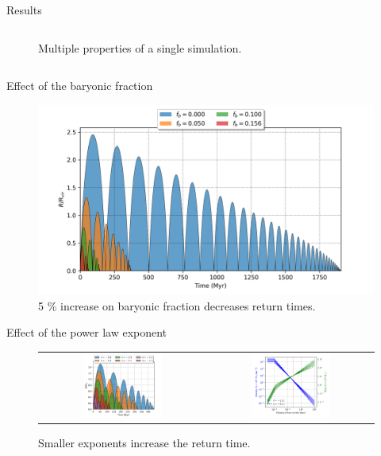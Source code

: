 \documentclass{beamer}
\begin{document}
\begin{frame}{Results}
\begin{columns}
\begin{column}{0.7\linewidth}
\begin{figure}[h]
				\caption{Multiple properties of a single simulation.}
			\end{figure}
		\end{column}
	\end{columns}
\end{frame}

\begin{frame}{Effect of the baryonic fraction}
	\begin{figure}[h]
		\centering
		\includegraphics[height=0.7\textheight]{"../Files/Week 5/baryonic_fraction_comparison"}
		\caption{5 \% increase on baryonic fraction decreases return times.}
	\end{figure}
\end{frame}

\begin{frame}{Effect of the power law exponent}
	\begin{figure}[h]
		\centering
		\begin{tabular}{cc}
			\includegraphics[width = 0.5\textwidth]{"../Files/Week 6/power_law"} & \includegraphics[width = 0.5\textwidth]{"../Files/Week 6/power_law_density"}
		\end{tabular}
		\caption{Smaller exponents increase the return time.}
	\end{figure}
\end{frame}
\end{document}
